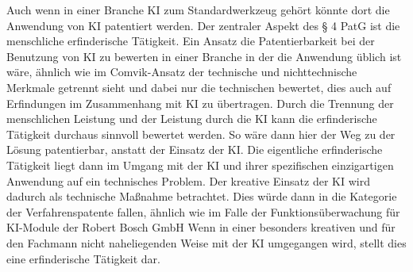 Auch wenn in einer Branche KI zum Standardwerkzeug gehört
könnte dort die Anwendung von KI patentiert werden.
Der zentraler Aspekt 
des § 4 PatG ist die menschliche erfinderische Tätigkeit.
Ein Ansatz die Patentierbarkeit bei der Benutzung 
von KI zu bewerten in einer Branche in der die Anwendung 
üblich ist wäre, ähnlich wie im Comvik-Ansatz
der technische
und nichttechnische Merkmale getrennt sieht
und dabei nur die technischen bewertet, dies auch 
auf Erfindungen im Zusammenhang mit KI zu übertragen.
Durch die Trennung der menschlichen Leistung und 
der Leistung durch die KI kann die erfinderische Tätigkeit 
durchaus sinnvoll bewertet werden.
So wäre dann hier der Weg zu der Lösung patentierbar, anstatt der
Einsatz der KI.
Die eigentliche erfinderische Tätigkeit liegt dann im Umgang mit der KI 
und ihrer spezifischen einzigartigen Anwendung auf ein technisches Problem.
Der kreative Einsatz der KI wird dadurch 
als technische Maßnahme betrachtet. 
Dies würde dann in die Kategorie der Verfahrenspatente fallen,
ähnlich wie im Falle der Funktionsüberwachung für KI-Module
der Robert Bosch GmbH \cite{DPMAregisterOriginaldokumentDE102017212328A1}
Wenn in einer besonders kreativen und für den Fachmann
nicht naheliegenden Weise mit der KI umgegangen wird, stellt 
dies eine erfinderische Tätigkeit dar.
\\
